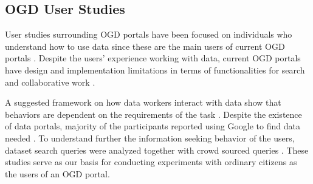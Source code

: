 \documentclass{sigchi}
\begin{document}
\subsection{OGD User Studies}
User studies surrounding OGD portals have been focused on individuals who understand how to use data since these are the main users of current OGD portals \cite{choi2017characteristics,kacprzak2019characterising, koesten2019collaborative, koesten2017trials}. Despite the users' experience working with data, current OGD portals have design and implementation limitations in terms of functionalities for search \cite{kacprzak2019characterising, koesten2017trials} and collaborative work \cite{choi2017characteristics, koesten2019collaborative}.

A suggested framework on how data workers interact with data show that behaviors are dependent on the requirements of the task \cite{koesten2017trials}. Despite the existence of data portals, majority of the participants reported using Google to find data needed \cite{koesten2017trials}. To understand further the information seeking behavior of the users, dataset search queries were analyzed together with crowd sourced queries \cite{kacprzak2019characterising}. These studies serve as our basis for conducting experiments with ordinary citizens as the users of an OGD portal. 

\begin{comment}
Collaborative work using OGD was found to be interdisciplinary in nature \cite{choi2017characteristics}. Even though the focus of our study is not on collaborative data work, it is worth noting that the typical projects that emerge from OGD are statistical analysis and exploratory data tools that allow end users to examine data on their own \cite{choi2017characteristics}. 
\end{comment}

\begin{comment}
We conducted a climate survey to gauge the awareness and the interest of Filipino citizens about open government data. We also conducted a pilot study to evaluate the usability of the Open Data Philippines and Freedom of Information portals through search tasks. The survey was distributed electronically through snowball sampling on July 2019 while the usability interviews were conducted between July to August 2019 around the areas of Metro Manila. We obtained participant consent as per research ethics requirements to be able to conduct this study.
\end{comment}
\end{document}
